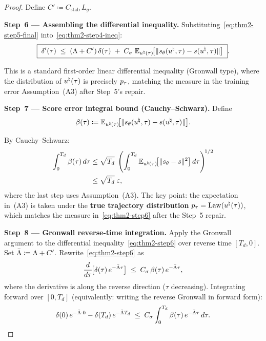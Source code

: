 \begin{proof}
Define $C' \coloneqq C_{\mathrm{stab}}\,L_{g}$.

\medskip
\noindent
\textbf{Step~6 --- Assembling the differential inequality.}
Substituting~\eqref{eq:thm2-step5-final} into~\eqref{eq:thm2-step4-ineq}:
\begin{equation}
\boxed{\;
\delta'(\tau)
\;\le\; (\Lambda + C')\,\delta(\tau)
\;+\; C_{\sigma}\;\mathbb{E}_{u^{\natural}(\tau)}\!\bigl[\lVert s_{\theta}(u^{\natural}, \tau) - s(u^{\natural}, \tau) \rVert\bigr]
\;}.
\label{eq:thm2-step6}
\end{equation}

This is a standard first-order linear differential inequality (Gronwall type), where the distribution of $u^{\natural}(\tau)$ is precisely $p_{\tau}$, matching the measure in the training error Assumption~(A3) after Step~5's repair.

\medskip
\noindent
\textbf{Step~7 --- Score error integral bound (Cauchy--Schwarz).}
Define
\begin{equation}
\beta(\tau) \coloneqq \mathbb{E}_{u^{\natural}(\tau)}\!\bigl[\lVert s_{\theta}(u^{\natural}, \tau) - s(u^{\natural}, \tau) \rVert\bigr].
\label{eq:thm2-step7-beta}
\end{equation}

By Cauchy--Schwarz:
\begin{align}
\int_{0}^{T_{d}} \beta(\tau)\,d\tau
&\le \sqrt{T_{d}}\;\left(\int_{0}^{T_{d}} \mathbb{E}_{u^{\natural}(\tau)}\!\bigl[\lVert s_{\theta} - s \rVert^{2}\bigr]\,d\tau\right)^{\!1/2} \notag \\
&\le \sqrt{T_{d}}\;\varepsilon,
\label{eq:thm2-step7-cs}
\end{align}
where the last step uses Assumption~(A3). The key point: the expectation in~(A3) is taken under the \textbf{true trajectory distribution} $p_{\tau} = \mathrm{Law}(u^{\natural}(\tau))$, which matches the measure in~\eqref{eq:thm2-step6} after the Step~5 repair.

\medskip
\noindent
\textbf{Step~8 --- Gronwall reverse-time integration.}
Apply the Gronwall argument to the differential inequality~\eqref{eq:thm2-step6} over reverse time $[T_{d}, 0]$. Set $\bar{\Lambda} \coloneqq \Lambda + C'$. Rewrite~\eqref{eq:thm2-step6} as
\begin{equation}
\frac{d}{d\tau}\!\bigl[\delta(\tau)\,e^{-\bar{\Lambda} \tau}\bigr]
\;\le\; C_{\sigma}\,\beta(\tau)\,e^{-\bar{\Lambda} \tau},
\label{eq:thm2-step8-rewrite}
\end{equation}
where the derivative is along the reverse direction ($\tau$ decreasing). Integrating forward over $[0, T_{d}]$ (equivalently: writing the reverse Gronwall in forward form):
\begin{equation}
\delta(0)\,e^{-\bar{\Lambda} \cdot 0} - \delta(T_{d})\,e^{-\bar{\Lambda} T_{d}}
\;\le\; C_{\sigma} \int_{0}^{T_{d}} \beta(\tau)\,e^{-\bar{\Lambda} \tau}\,d\tau.
\label{eq:thm2-step8-int}
\end{equation}


\end{proof}
